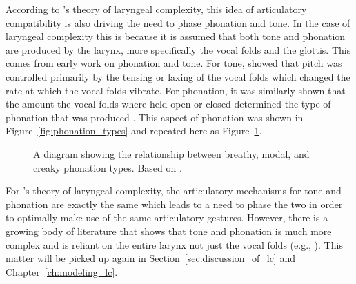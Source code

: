 According to \citeauthor{silvermanLaryngealComplexityOtomanguean1997}'s theory of laryngeal complexity, this idea of articulatory compatibility is also driving the need to phase phonation and tone. In the case of laryngeal complexity this is because it is assumed that both tone and phonation are produced by the larynx, more specifically the vocal folds and the glottis. This comes from early work on phonation and tone. For tone, \citet{ohalaProductionTone11978} showed that pitch was controlled primarily by the tensing or laxing of the vocal folds which changed the rate at which the vocal folds vibrate. For phonation, it was similarly shown that the amount the vocal folds where held open or closed determined the type of phonation that was produced \citep{ladefogedSoundsWorldLanguages1996}. This aspect of phonation was shown in Figure~\ref{fig:phonation_types} and repeated here as Figure~\ref{fig:phonation_types_repeat}. 

\begin{figure}[h!]
    \centering
    \caption{A diagram showing the relationship between breathy, modal, and creaky phonation types. Based on \citet{gordonPhonationTypesCrosslinguistic2001}.}
    \label{fig:phonation_types_repeat}
\end{figure}

For \citeauthor{silvermanLaryngealComplexityOtomanguean1997}'s \citeyear{silvermanLaryngealComplexityOtomanguean1997} theory of laryngeal complexity, the articulatory mechanisms for tone and phonation are exactly the same which leads to a need to phase the two in order to optimally make use of the same articulatory gestures. However, there is a growing body of literature that shows that tone and phonation is much more complex and is reliant on the entire larynx not just the vocal folds (e.g., \cite{eslingVoiceQualityLaryngeal2019}). This matter will be picked up again in Section~\ref{sec:discussion_of_lc} and Chapter~\ref{ch:modeling_lc}.

